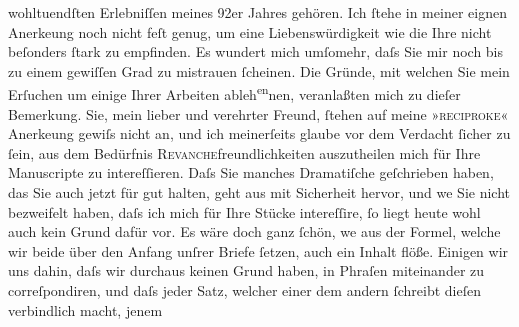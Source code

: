                wohltuendſten Erlebniſſen  meines 92er Jahres
               gehören. Ich{ }ſtehe in meiner eignen Anerke{\geminationn}ung noch
               nicht feſt genug, um eine Liebenswürdigkeit wie die Ihre nicht beſonders{ }ſtark zu
               empfinden. Es wundert mich umſomehr, daſs Sie mir noch bis zu einem gewiſſen Grad zu
               mistrauen{ }ſcheinen. Die Gründe, mit welchen Sie mein Erſuchen um einige Ihrer
               Arbeiten ableh\substVorne{}\textsuperscript{en}\substDazwischen{}nen\substHinten{}, {\pb}veranlaßten mich zu dieſer Bemerkung. Sie, mein
               lieber und verehrter Freund,{ }ſtehen auf meine »\textsc{reciproke}«
                  Anerke{\geminationn}ung gewiſs nicht an, und ich meinerſeits
               glaube vor dem Verdacht{ }ſicher zu{ }ſein, aus dem Bedürfnis \textsc{Revanche}freundlichkeiten auszutheilen mich für Ihre Manuscripte zu
               intereſſieren. Daſs Sie manches Dramatiſche geſchrieben haben, das Sie auch jetzt für
               gut halten, geht aus \label{K_L03942-2v}\label{K_L03942-2} mit Sicherheit hervor,
               und we{\geminationn} Sie \label{K_L03942-3v}\label{K_L03942-3} nicht
               bezweifelt haben, daſs ich mich für Ihre Stücke intereſſire,{ }ſo liegt heute wohl auch
               kein Grund dafür vor. Es wäre doch ganz{ }ſchön, we{\geminationn} aus der Formel, welche wir beide
               über den Anfang unſrer Briefe{ }ſetzen, auch ein Inhalt flöße. Einigen wir uns dahin,
               daſs wir durchaus keinen Grund haben, in Phraſen {\pb}miteinander zu correſpondiren, und
               daſs jeder Satz, welcher einer dem andern{ }ſchreibt dieſen verbindlich macht, jenem
